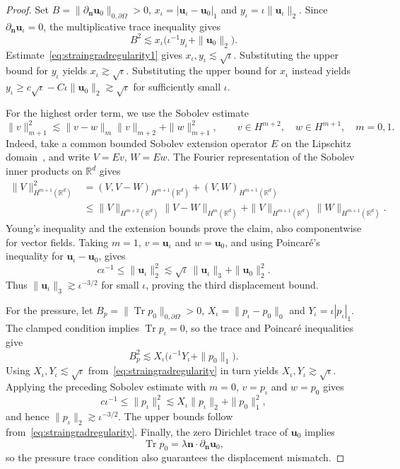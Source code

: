 \documentclass[10pt]{amsart}
\numberwithin{equation}{section}
\begin{document}
\begin{proof}
Set $B=\|\partial_{\boldsymbol n}\boldsymbol u_0\|_{0,\partial\Omega}>0$, $x_\iota=|\boldsymbol u_\iota-\boldsymbol u_0|_1$ and $y_\iota=\iota\|\boldsymbol u_\iota\|_2$. Since $\partial_{\boldsymbol n}\boldsymbol u_\iota=0$, the multiplicative trace inequality gives
\[
B^2\lesssim x_\iota\big(\iota^{-1}y_\iota+\|\boldsymbol u_0\|_2\big).
\]
Estimate~\eqref{eq:straingradregularity1} gives $x_\iota,y_\iota\lesssim\sqrt\iota$. Substituting the upper bound for $y_\iota$ yields $x_\iota\gtrsim\sqrt\iota$. Substituting the upper bound for $x_\iota$ instead yields $y_\iota\geq c\sqrt\iota-C\iota\|\boldsymbol u_0\|_2\gtrsim\sqrt\iota$ for sufficiently small $\iota$.

For the highest order term, we use the Sobolev estimate
\[
\|v\|_{m+1}^2\lesssim\|v-w\|_m\|v\|_{m+2}+\|w\|_{m+1}^2,
\qquad v\in H^{m+2},\quad w\in H^{m+1},\quad m=0,1.
\]
Indeed, take a common bounded Sobolev extension operator $E$ on the Lipschitz domain~\cite{Rychkov1999}, and write $V=Ev$, $W=Ew$. The Fourier representation of the Sobolev inner products on $\mathbb R^d$ gives
\[
\begin{aligned}
\|V\|_{H^{m+1}(\mathbb R^d)}^2
&=(V,V-W)_{H^{m+1}(\mathbb R^d)}+(V,W)_{H^{m+1}(\mathbb R^d)}\\
&\leq\|V\|_{H^{m+2}(\mathbb R^d)}\|V-W\|_{H^m(\mathbb R^d)}
+\|V\|_{H^{m+1}(\mathbb R^d)}\|W\|_{H^{m+1}(\mathbb R^d)}.
\end{aligned}
\]
Young's inequality and the extension bounds prove the claim, also componentwise for vector fields. Taking $m=1$, $v=\boldsymbol u_\iota$ and $w=\boldsymbol u_0$, and using Poincar\'e's inequality for $\boldsymbol u_\iota-\boldsymbol u_0$, gives
\[
c\iota^{-1}\leq\|\boldsymbol u_\iota\|_2^2
\lesssim\sqrt\iota\,\|\boldsymbol u_\iota\|_3+\|\boldsymbol u_0\|_2^2.
\]
Thus $\|\boldsymbol u_\iota\|_3\gtrsim\iota^{-3/2}$ for small $\iota$, proving the third displacement bound.

For the pressure, let $B_p=\|\operatorname{Tr}p_0\|_{0,\partial\Omega}>0$, $X_\iota=\|p_\iota-p_0\|_0$ and $Y_\iota=\iota|p_\iota|_1$. The clamped condition implies $\operatorname{Tr}p_\iota=0$, so the trace and Poincar\'e inequalities give
\[
B_p^2\lesssim X_\iota\big(\iota^{-1}Y_\iota+\|p_0\|_1\big).
\]
Using $X_\iota,Y_\iota\lesssim\sqrt\iota$ from~\eqref{eq:straingradregularity} in turn yields $X_\iota,Y_\iota\gtrsim\sqrt\iota$. Applying the preceding Sobolev estimate with $m=0$, $v=p_\iota$ and $w=p_0$ gives
\[
c\iota^{-1}\leq\|p_\iota\|_1^2
\lesssim X_\iota\|p_\iota\|_2+\|p_0\|_1^2,
\]
and hence $\|p_\iota\|_2\gtrsim\iota^{-3/2}$. The upper bounds follow from~\eqref{eq:straingradregularity}. Finally, the zero Dirichlet trace of $\boldsymbol u_0$ implies
\[
\operatorname{Tr}p_0=\lambda\boldsymbol n\cdot\partial_{\boldsymbol n}\boldsymbol u_0,
\]
so the pressure trace condition also guarantees the displacement mismatch.


\end{proof}
\end{document}
